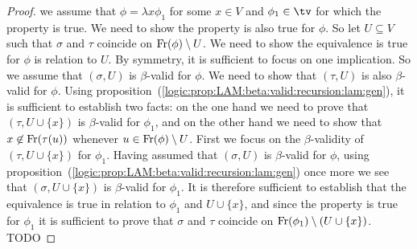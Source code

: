 \begin{proof}
    we assume that $\phi=\lambda x\phi_{1}$ for some $x\in V$ and $\phi_{1}\in\tv$
    for which the property is true. We need to show the property is also true
    for $\phi$. So let $U\subseteq V$ such that $\sigma$ and $\tau$ coincide
    on $\mbox{\rm Fr}(\phi)\setminus U$. We need to show the equivalence is true for 
    $\phi$ is relation to $U$. By symmetry, it is sufficient to focus on one 
    implication. So we assume that $(\sigma,U)$ is $\beta$-valid for $\phi$.
    We need to show that $(\tau,U)$ is also $\beta$-valid for $\phi$. Using
    proposition~(\ref{logic:prop:LAM:beta:valid:recursion:lam:gen}), it is
    sufficient to establish two facts: on the one hand we need to prove
    that $(\tau, U\cup\{x\})$ is $\beta$-valid for $\phi_{1}$, and on the
    other hand we need to show that $x\not\in\mbox{\rm Fr}(\tau(u))$ whenever
    $u\in\mbox{\rm Fr}(\phi)\setminus U$. First we focus on the $\beta$-validity
    of $(\tau,U\cup\{x\})$ for $\phi_{1}$. Having assumed that $(\sigma,U)$
    is $\beta$-valid for $\phi$, using 
    proposition~(\ref{logic:prop:LAM:beta:valid:recursion:lam:gen}) once more
    we see that $(\sigma, U\cup\{x\})$ is $\beta$-valid for $\phi_{1}$.
    It is therefore sufficient to establish that the equivalence is true
    in relation to $\phi_{1}$ and $U\cup\{x\}$, and since the property is
    true for $\phi_{1}$ it is sufficient to prove that $\sigma$ and $\tau$
    coincide on $\mbox{\rm Fr}(\phi_{1})\setminus(U\cup\{x\})$. TODO
\end{proof}

